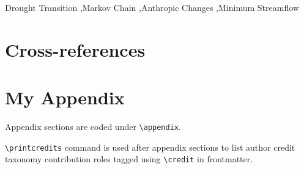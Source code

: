 \documentclass[a4paper,fleqn]{cas-dc}
\begin{document}


\begin{keywords}
Drought Transition \sep Markov Chain \sep Anthropic Changes \sep Minimum Streamflow
\end{keywords}


\maketitle


% 
%
%
%
\section{Cross-references}


\appendix
\section{My Appendix}
Appendix sections are coded under \verb+\appendix+.

\verb+\printcredits+ command is used after appendix sections to list 
author credit taxonomy contribution roles tagged using \verb+\credit+ 
in frontmatter.

\printcredits

%





\vskip3pt

%
%
\end{document}
